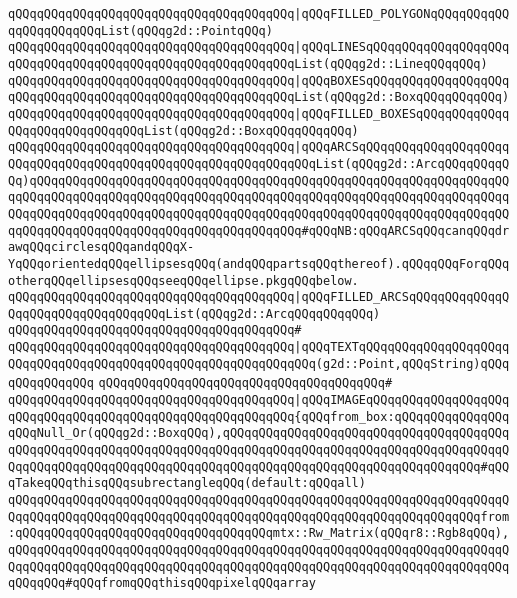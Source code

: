\verb|qQQqqQQqqQQqqQQqqQQqqQQqqQQqqQQqqQQqqQQq|\verb#|qQQqFILLED_POLYGONqQQqqQQqqQQqqQQqqQQqqQQqList(qQQqg2d::PointqQQq)#\newline
\verb|qQQqqQQqqQQqqQQqqQQqqQQqqQQqqQQqqQQqqQQq|\verb#|qQQqLINESqQQqqQQqqQQqqQQqqQQqqQQqqQQqqQQqqQQqqQQqqQQqqQQqqQQqqQQqqQQqList(qQQqg2d::LineqQQqqQQq)#\newline
\verb|qQQqqQQqqQQqqQQqqQQqqQQqqQQqqQQqqQQqqQQq|\verb#|qQQqBOXESqQQqqQQqqQQqqQQqqQQqqQQqqQQqqQQqqQQqqQQqqQQqqQQqqQQqqQQqqQQqList(qQQqg2d::BoxqQQqqQQqqQQq)#\newline
\verb|qQQqqQQqqQQqqQQqqQQqqQQqqQQqqQQqqQQqqQQq|\verb#|qQQqFILLED_BOXESqQQqqQQqqQQqqQQqqQQqqQQqqQQqqQQqList(qQQqg2d::BoxqQQqqQQqqQQq)#\newline
\verb|qQQqqQQqqQQqqQQqqQQqqQQqqQQqqQQqqQQqqQQq|\verb#|qQQqARCSqQQqqQQqqQQqqQQqqQQqqQQqqQQqqQQqqQQqqQQqqQQqqQQqqQQqqQQqqQQqqQQqList(qQQqg2d::ArcqQQqqQQqqQQq)qQQqqQQqqQQqqQQqqQQqqQQqqQQqqQQqqQQqqQQqqQQqqQQqqQQqqQQqqQQqqQQqqQQqqQQqqQQqqQQqqQQqqQQqqQQqqQQqqQQqqQQqqQQqqQQqqQQqqQQqqQQqqQQqqQQqqQQqqQQqqQQqqQQqqQQqqQQqqQQqqQQqqQQqqQQqqQQqqQQqqQQqqQQqqQQqqQQqqQQqqQQqqQQqqQQqqQQqqQQqqQQqqQQqqQQqqQQqqQQqqQQqqQQq#\verb|#qQQqNB:qQQqARCSqQQqcanqQQqdrawqQQqcirclesqQQqandqQQqX-YqQQqorientedqQQqellipsesqQQq(andqQQqpartsqQQqthereof).qQQqqQQqForqQQqotherqQQqellipsesqQQqseeqQQqellipse.pkgqQQqbelow.|\newline
\verb|qQQqqQQqqQQqqQQqqQQqqQQqqQQqqQQqqQQqqQQq|\verb#|qQQqFILLED_ARCSqQQqqQQqqQQqqQQqqQQqqQQqqQQqqQQqqQQqList(qQQqg2d::ArcqQQqqQQqqQQq)#\newline
\verb|qQQqqQQqqQQqqQQqqQQqqQQqqQQqqQQqqQQqqQQq#|\newline
\verb|qQQqqQQqqQQqqQQqqQQqqQQqqQQqqQQqqQQqqQQq|\verb#|qQQqTEXTqQQqqQQqqQQqqQQqqQQqqQQqqQQqqQQqqQQqqQQqqQQqqQQqqQQqqQQqqQQqqQQq(g2d::Point,qQQqString)qQQqqQQqqQQqqQQq#\newline
\verb|qQQqqQQqqQQqqQQqqQQqqQQqqQQqqQQqqQQqqQQq#|\newline
\verb|qQQqqQQqqQQqqQQqqQQqqQQqqQQqqQQqqQQqqQQq|\verb#|qQQqIMAGEqQQqqQQqqQQqqQQqqQQqqQQqqQQqqQQqqQQqqQQqqQQqqQQqqQQqqQQqqQQq{qQQqfrom_box:qQQqqQQqqQQqqQQqqQQqNull_Or(qQQqg2d::BoxqQQq),qQQqqQQqqQQqqQQqqQQqqQQqqQQqqQQqqQQqqQQqqQQqqQQqqQQqqQQqqQQqqQQqqQQqqQQqqQQqqQQqqQQqqQQqqQQqqQQqqQQqqQQqqQQqqQQqqQQqqQQqqQQqqQQqqQQqqQQqqQQqqQQqqQQqqQQqqQQqqQQqqQQqqQQqqQQqqQQq#\verb|#qQQqTakeqQQqthisqQQqsubrectangleqQQq(default:qQQqall)|\newline
\verb|qQQqqQQqqQQqqQQqqQQqqQQqqQQqqQQqqQQqqQQqqQQqqQQqqQQqqQQqqQQqqQQqqQQqqQQqqQQqqQQqqQQqqQQqqQQqqQQqqQQqqQQqqQQqqQQqqQQqqQQqqQQqqQQqqQQqqQQqfrom:qQQqqQQqqQQqqQQqqQQqqQQqqQQqqQQqqQQqmtx::Rw_Matrix(qQQqr8::Rgb8qQQq),qQQqqQQqqQQqqQQqqQQqqQQqqQQqqQQqqQQqqQQqqQQqqQQqqQQqqQQqqQQqqQQqqQQqqQQqqQQqqQQqqQQqqQQqqQQqqQQqqQQqqQQqqQQqqQQqqQQqqQQqqQQqqQQqqQQqqQQqqQQqqQQqqQQq#qQQqfromqQQqthisqQQqpixelqQQqarray|\newline
